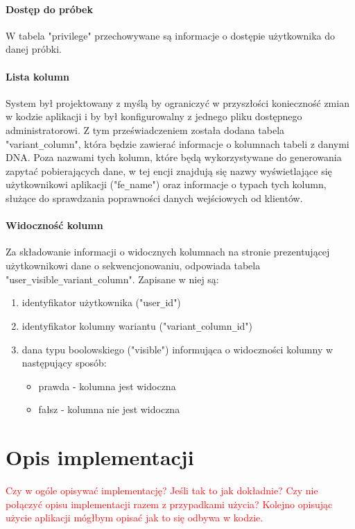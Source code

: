\documentclass[a4paper,12pt,twoside]{article}
\begin{document}
\paragraph{Dostęp do próbek} W tabela "privilege" przechowywane są informacje o 
dostępie użytkownika do danej próbki.

\paragraph{Lista kolumn} System był projektowany z myślą by ograniczyć w przyszłości konieczność zmian 
w kodzie aplikacji i by był konfigurowalny z jednego pliku dostępnego administratorowi.
Z tym przeświadczeniem została dodana tabela "variant\verb!_!column", która będzie zawierać
informacje o kolumnach tabeli z danymi DNA. Poza nazwami tych kolumn, które będą 
wykorzystywane do generowania zapytać pobierających dane, w tej encji znajdują
się nazwy wyświetlające się użytkownikowi aplikacji ("fe\verb!_!name") oraz informacje o typach
tych kolumn, służące do sprawdzania poprawności danych wejściowych od klientów.

\newpage
\paragraph{Widoczność kolumn} Za składowanie informacji o widocznych kolumnach na
stronie prezentującej użytkownikowi dane o sekwencjonowaniu, odpowiada tabela 
"user\verb!_!visible\verb!_!variant\verb!_!column". Zapisane w niej są:
\begin{enumerate}[1)]
\item identyfikator użytkownika ("user\verb!_!id")
\item identyfikator kolumny wariantu ("variant\verb!_!column\verb!_!id")
\item dana typu boolowskiego ("visible") informująca o widoczności kolumny w następujący sposób:
\begin{itemize}
\item prawda - kolumna jest widoczna
\item fałsz - kolumna nie jest widoczna
\end{itemize}
\end{enumerate} 









\newpage
\section{Opis implementacji}  
\textcolor{red}{
Czy w ogóle opisywać implementację? Jeśli tak to jak dokładnie? 
Czy nie połączyć opisu implementacji razem z przypadkami użycia?
Kolejno opisując użycie aplikacji mógłbym opisać jak to się odbywa w kodzie.
}
\end{document}
